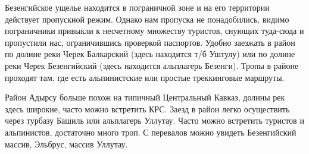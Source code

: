 Безенгийское ущелье находится в пограничной зоне и на его территории действует пропускной режим. Однако нам пропуска не понадобились, видимо пограничники привыкли к несчетному множеству туристов, снующих туда-сюда и пропустили нас, ограничившись проверкой паспортов. Удобно заезжать в район по долине реки Черек Балкарский (здесь находится т/б Уштулу) или по долине реки Черек Безенгийский (здесь находится альплагерь Безенги). Тропы в районе проходят там, где есть альпинистские или простые треккинговые маршруты.

Район Адырсу больше похож на типичный Центральный Кавказ, долины рек здесь широкие, часто можно встретить КРС. Заезд в район легко осуществить через турбазу Башиль или альплагерь Уллутау. Часто можно встретить туристов и альпинистов, достаточно много троп. С перевалов можно увидеть Безенгийский массив, Эльбрус, массив Уллутау.
    
    
